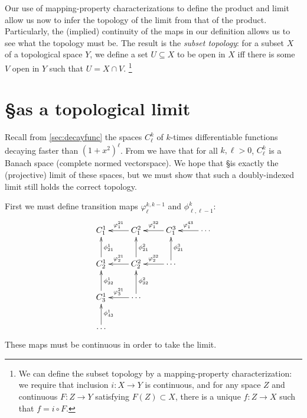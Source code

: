         Our use of mapping-property characterizations to define the product and limit allow us now to infer the topology of the limit from that of the product.
        Particularly, the (implied) continuity of the maps in our definition allows us to see what the topology must be.
        The result is the \emph{subset topology}: for a subset $X$ of a topological space $Y$, we define a set $U\subseteq X$ to be open in $X$ iff there is some $V$ open in $Y$ such that $U=X\cap V$.%
        \footnote{We can define the subset topology by a mapping-property characterization: we require that inclusion $i:X\rightarrow Y$ is continuous, and for any space $Z$ and continuous $F:Z\rightarrow Y$ satisfying $F(Z)\subset X$, there is a unique $f:Z\rightarrow X$ such that $f=i\circ F$.}

    \section{\S as a topological limit}
      Recall from \autoref{sec:decayfunc} the spaces $C^k_\ell$ of $k$-times differentiable functions decaying faster than $(1+x^2)^\ell$.
      From  we have that for all $k,\ell>0$, $C^k_\ell$ is a Banach space (complete normed vectorspace).
      We hope that \S is exactly the (projective) limit of these spaces, but we must show that such a doubly-indexed limit still holds the correct topology.

      First we must define transition maps $\varphi^{k,k-1}_\ell$ and $\phi^k_{\ell,\ell-1}$:
      \begin{displaymath}
        \xymatrix{
          C^1_1  & C^2_1 \ar[l]_{\varphi^{21}_1} & C^3_1 \ar[l]_{\varphi^{32}_1} & \cdots \ar[l]_{\varphi^{43}_1} \\
          C^1_2 \ar[u]_{\phi^1_{21}} & C^2_2 \ar[l]_{\varphi^{21}_2} \ar[u]_{\phi^2_{21}} & \cdots \ar[l]_{\varphi^{32}_2} \ar[u]_{\phi^3_{21}} \\
          C^1_3 \ar[u]_{\phi^1_{32}} & \cdots \ar[l]_{\varphi^{21}_3} \ar[u]_{\phi^2_{32}} \\
          \cdots \ar[u]_{\phi^1_{43}} 
        }
      \end{displaymath}
      These maps must be continuous in order to take the limit.

